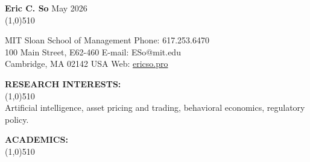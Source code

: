 \documentclass[11pt]{article}
\begin{document}
\setlength{\parindent}{0in}
{\bf \LARGE Eric C. So}  \hfill May 2026\\
\vskip -0.8cm \line(1,0){510} \\ \vskip -0.35cm

MIT Sloan School of Management  \hfill Phone:  617.253.6470\\            
100 Main Street, E62-460    \hfill  E-mail:  ESo@mit.edu\\         
Cambridge, MA  02142 USA \hfill    Web: \href{https://ericso.pro}{ericso.pro}\\
\vskip -0.5cm


\vskip 0.75cm
\setlength{\parindent}{0in}
{\bf RESEARCH INTERESTS:\\}
\vskip -0.85cm \line(1,0){510} \\
\setlength{\parindent}{0.5in}
Artificial intelligence, asset pricing and trading, behavioral economics, regulatory policy.

\vskip 0.75cm
\setlength{\parindent}{0in}
{\bf ACADEMICS:\\}
\vskip -0.85cm \line(1,0){510} \\ \vskip -0.5cm
\end{document}
